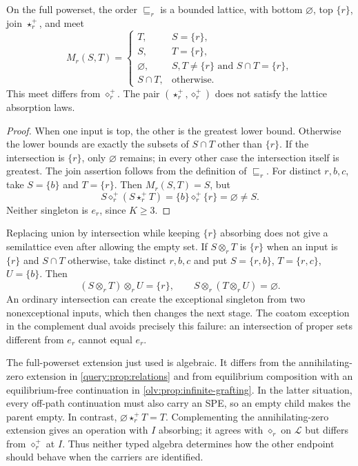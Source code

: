 \begin{proposition}\label{dual:prop:meet}
On the full powerset, the order $\sqsubseteq_r$ is a bounded lattice,
with bottom $\varnothing$, top $\{r\}$, join $\star_r^+$, and meet
\begin{equation}\label{dual:eq:actual-meet}
 M_r(S,T)=\begin{cases}
 T,&S=\{r\},\\
 S,&T=\{r\},\\
 \varnothing,&S,T\ne\{r\}\text{ and }S\cap T=\{r\},\\
 S\cap T,&\text{otherwise}.
 \end{cases}
\end{equation}
This meet differs from $\diamond_r^+$. The pair
$(\star_r^+,\diamond_r^+)$ does not satisfy the lattice absorption
laws.
\end{proposition}
\begin{proof}
When one input is top, the other is the greatest lower bound. Otherwise
the lower bounds are exactly the subsets of $S\cap T$ other than
$\{r\}$. If the intersection is $\{r\}$, only $\varnothing$
remains; in every other case the intersection itself is greatest.
The join assertion follows from the definition of $\sqsubseteq_r$.
For distinct $r,b,c$, take $S=\{b\}$ and $T=\{r\}$.
Then $M_r(S,T)=S$, but
\[
 S\diamond_r^+(S\star_r^+T)
 =\{b\}\diamond_r^+\{r\}=\varnothing\ne S.
\]
Neither singleton is $e_r$, since $K\geq3$.
\end{proof}

Replacing union by intersection while keeping $\{r\}$ absorbing
does not give a semilattice even after allowing the empty set. If
$S\mathbin{\otimes_r}T$ is $\{r\}$ when an input is $\{r\}$
and $S\cap T$ otherwise, take distinct $r,b,c$ and put
$S=\{r,b\}$, $T=\{r,c\}$, $U=\{b\}$. Then
\[
 (S\mathbin{\otimes_r}T)\mathbin{\otimes_r}U=\{r\},\qquad
 S\mathbin{\otimes_r}(T\mathbin{\otimes_r}U)=\varnothing.
\]
An ordinary intersection can create the exceptional singleton from two
nonexceptional inputs, which then changes the next stage. The coatom
exception in the complement dual avoids precisely this failure: an
intersection of proper sets different from $e_r$ cannot equal $e_r$.

The full-powerset extension just used is algebraic. It differs from the
annihilating-zero extension in \cref{query:prop:relations} and from
equilibrium composition with an equilibrium-free continuation in
\cref{olv:prop:infinite-grafting}. In the latter situation, every
off-path continuation must also carry an SPE, so an empty child makes
the parent empty. In contrast,
$\varnothing\star_r^+T=T$. Complementing the annihilating-zero
extension gives an operation with $I$ absorbing; it agrees with
$\diamond_r$ on $\mathcal L$ but differs from
$\diamond_r^+$ at $I$. Thus neither typed algebra determines how the
other endpoint should behave when the carriers are identified.

